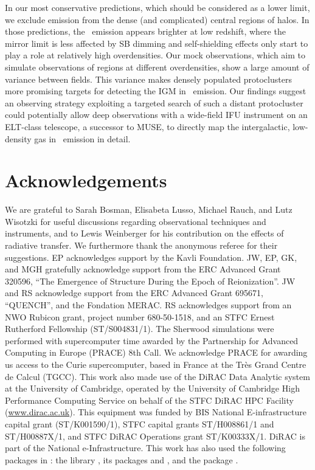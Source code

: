 In our most conservative predictions, which should be considered as a lower limit, we exclude emission from the dense (and complicated) central regions of halos. In those predictions, the \lya\ emission appears brighter at low redshift, where the mirror limit is less affected by SB dimming and self-shielding effects only start to play a role at relatively high overdensities. Our mock observations, which aim to simulate observations of regions at different overdensities, show a large amount of variance between fields. This variance makes densely populated protoclusters more promising targets for detecting the IGM in \lya\ emission. Our findings suggest an observing strategy exploiting a targeted search of such a distant protocluster could potentially allow deep observations with a wide-field IFU instrument on an ELT-class telescope, a successor to MUSE, to directly map the intergalactic, low-density gas in \lya\ emission in detail.

\section*{Acknowledgements}

We are grateful to Sarah Bosman, Elisabeta Lusso, Michael Rauch, and Lutz Wisotzki for useful discussions regarding observational techniques and instruments, and to Lewis Weinberger for his contribution on the effects of radiative transfer. We furthermore thank the anonymous referee for their suggestions. EP acknowledges support by the Kavli Foundation. JW, EP, GK, and MGH gratefully acknowledge support from the ERC Advanced Grant 320596, ``The Emergence of Structure During the Epoch of Reionization''. JW and RS acknowledge support from the ERC Advanced Grant 695671, ``QUENCH'', and the Fondation MERAC. RS acknowledges support from an NWO Rubicon grant, project number 680-50-1518, and an STFC Ernest Rutherford Fellowship (ST/S004831/1). The Sherwood simulations were performed with supercomputer time awarded by the Partnership for Advanced Computing in Europe (PRACE) 8th Call. We acknowledge PRACE for awarding us access to the Curie supercomputer, based in France at the Tr\`es Grand Centre de Calcul (TGCC). This work also made use of the DiRAC Data Analytic system at the University of Cambridge, operated by the University of Cambridge High Performance Computing Service on behalf of the STFC DiRAC HPC Facility (\url{www.dirac.ac.uk}). This equipment was funded by BIS National E-infrastructure capital grant (ST/K001590/1), STFC capital grants ST/H008861/1 and ST/H00887X/1, and STFC DiRAC Operations grant ST/K00333X/1. DiRAC is part of the National e-Infrastructure. This work has also used the following packages in : the  library \citep{Jones2001}, its packages  \citep{2011CSE....13b..22V} and  \citep{Hunter2007}, and the  package \citep{2013A&A...558A..33A, 2018AJ....156..123A}.